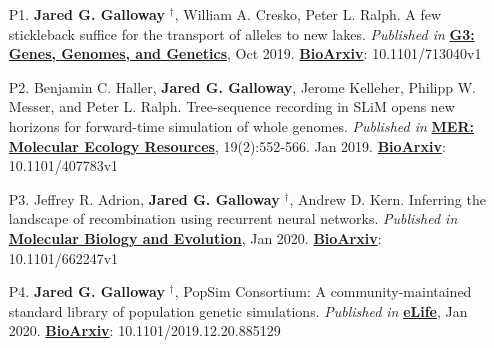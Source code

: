 \documentclass[letterpaper,11pt]{article}
\let\oldhref\href
\renewcommand{\href}[2]{\oldhref{#1}{\bfseries#2}}
\begin{document}
\begin{enumerate}
\item [P1.] \textbf{Jared G. Galloway} $^{\dagger}$, William A. Cresko, Peter L. Ralph. A few stickleback suffice for the transport
of alleles to new lakes. 
\textit{Published in} 
\href{https://www.g3journal.org/content/early/2019/12/04/g3.119.400564}{G3: Genes, Genomes, and Genetics}, Oct 2019.
\href{https://www.biorxiv.org/content/10.1101/713040v1.abstract}{BioArxiv}: 10.1101/713040v1

\item [P2.] Benjamin C. Haller, \textbf{Jared G. Galloway}, Jerome Kelleher, Philipp W. Messer, and Peter L. Ralph.
Tree-sequence recording in SLiM opens new horizons for forward-time simulation of whole genomes. 
\textit{Published in} 
\href{https://onlinelibrary.wiley.com/doi/abs/10.1111/1755-0998.12968}{MER: Molecular Ecology Resources}, 19(2):552-566. Jan 2019. 
\href{https://www.biorxiv.org/content/10.1101/407783v1}{BioArxiv}: 10.1101/407783v1 

\item [P3.] Jeffrey R. Adrion, \textbf{Jared G. Galloway} $^{\dagger}$, Andrew D. Kern. Inferring the landscape of recombination 
using recurrent neural networks. 
\textit{Published in} 
\href{https://academic.oup.com/mbe}{Molecular Biology and Evolution}, Jan 2020.
\href{https://www.biorxiv.org/content/10.1101/662247v1.abstract}{BioArxiv}: 10.1101/662247v1

\item [P4.] \textbf{Jared G. Galloway} $^{\dagger}$, PopSim Consortium:
A community-maintained standard library of population genetic simulations.
\textit{Published in}
\href{https://elifesciences.org/?gclid=CjwKCAiA6vXwBRBKEiwAYE7iS0LA_KboY5NjoOVJAMq06BEUSsqPFV9R1GA1NUUIgYw2XgTiv1fUxhoC3xYQAvD_BwE}{eLife}, Jan 2020.
\href{https://www.biorxiv.org/content/10.1101/2019.12.20.885129v1}{BioArxiv}: 10.1101/2019.12.20.885129 




\end{enumerate}
\end{document}
